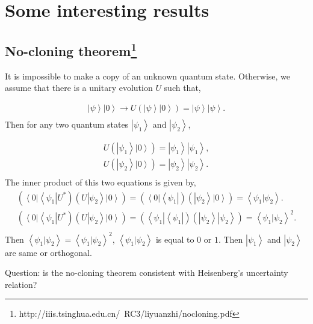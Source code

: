 \documentclass[onecolumn,pra,superscriptaddress,nofootinbib]{revtex4-1}
\newcommand{\bra}[1]{\mbox{$\left\langle #1 \right|$}}
\newcommand{\ket}[1]{\mbox{$\left| #1 \right\rangle$}}
\newcommand{\braket}[2]{\mbox{$\left\langle #1 | #2 \right\rangle$}}
\begin{document}
\section{Some interesting results}

\subsection{No-cloning theorem\footnote{http://iiis.tsinghua.edu.cn/~RC3/liyuanzhi/nocloning.pdf}}
It is  impossible to make a copy of an unknown quantum state. Otherwise, we assume that there is a unitary evolution $U$ such that,

\begin{equation} \label{NCT:unitary evolution}
\begin{aligned}
\ket{\psi}\ket{0}\rightarrow U(\ket{\psi}\ket{0})=\ket{\psi}\ket{\psi}.\\
\end{aligned}
\end{equation}
Then for any two quantum states $\ket{\psi_1}$ and $\ket{\psi_2}$,

\begin{equation} \label{NCT:two unitary evolution}
\begin{aligned}
U(\ket{\psi_1}\ket{0})=\ket{\psi_1}\ket{\psi_1},\\
U(\ket{\psi_2}\ket{0})=\ket{\psi_2}\ket{\psi_2}.\\
\end{aligned}
\end{equation}
The inner product of this two equations is given by,
\begin{equation} \label{NCT:inner product}
\begin{aligned}
(\bra{0}\bra{\psi_1}U^*)(U\ket{\psi_2}\ket{0})=
(\bra{0}\bra{\psi_1})(\ket{\psi_2}\ket{0})=\braket{\psi_1}{\psi_2}.\\
(\bra{0}\bra{\psi_1}U^*)(U\ket{\psi_2}\ket{0})=(\bra{\psi_1}\bra{\psi_1})(\ket{\psi_2}\ket{\psi_2})=\braket{\psi_1}{\psi_2}^2.\\
\end{aligned}
\end{equation}
Then $\braket{\psi_1}{\psi_2}=\braket{\psi_1}{\psi_2}^2$, $\braket{\psi_1}{\psi_2}$ is equal to $0$ or $1$. Then $\ket{\psi_1}$ and $\ket{\psi_2}$ are same or orthogonal.

Question: is the no-cloning theorem consistent with Heisenberg's uncertainty relation?
\end{document}
